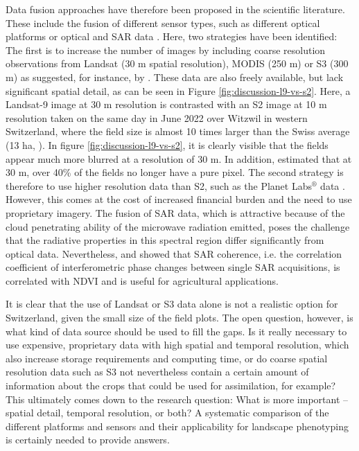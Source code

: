 Data fusion approaches have therefore been proposed in the scientific literature. These include the fusion of different sensor types, such as different optical platforms or optical and \gls{SAR} data \citep[for example]{pipia_fusing_2019, lobert_mowing_2021}. Here, two strategies have been identified: The first is to increase the number of images by including coarse resolution observations from Landsat (30 m spatial resolution), \gls{MODIS} (250 m) or \gls{S3} (300 m) as suggested, for instance, by \cite{zhou_reconstruction_2020}. These data are also freely available, but lack significant spatial detail, as can be seen in Figure \ref{fig:discussion-l9-vs-s2}. Here, a Landsat-9 image at 30 m resolution is contrasted with an S2 image at 10 m resolution taken on the same day in June 2022 over Witzwil in western Switzerland, where the field size is almost 10 times larger than the Swiss average (13 ha, \cite{perich_pixel-based_2023}). In figure \ref{fig:discussion-l9-vs-s2}, it is clearly visible that the fields appear much more blurred at a resolution of 30 m. In addition, \cite{meier_assessments_2020} estimated that at 30 m, over 40\% of the fields no longer have a pure pixel. The second strategy is therefore to use higher resolution data than \gls{S2}, such as the Planet Labs$^{\circledR}$ data \citep[for example]{sadeh_fusion_2021}. However, this comes at the cost of increased financial burden and the need to use proprietary imagery. The fusion of \gls{SAR} data, which is attractive because of the cloud penetrating ability of the microwave radiation emitted, poses the challenge that the radiative properties in this spectral region differ significantly from optical data. Nevertheless, \cite{bai_could_2020} and \cite{villarroya-carpio_sentinel-1_2022} showed that \gls{SAR} coherence, i.e. the correlation coefficient of interferometric phase changes between single \gls{SAR} acquisitions, is correlated with \gls{NDVI} and is useful for agricultural applications.

It is clear that the use of Landsat or \gls{S3} data alone is not a realistic option for Switzerland, given the small size of the field plots. The open question, however, is what kind of data source should be used to fill the gaps. Is it really necessary to use expensive, proprietary data with high spatial and temporal resolution, which also increase storage requirements and computing time, or do coarse spatial resolution data such as \gls{S3} not nevertheless contain a certain amount of information about the crops that could be used for assimilation, for example? This ultimately comes down to the research question: What is more important -- spatial detail, temporal resolution, or both? A systematic comparison of the different platforms and sensors and their applicability for landscape phenotyping is certainly needed to provide answers.

